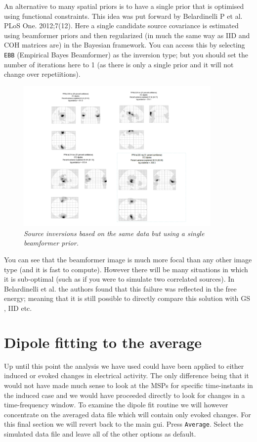 An alternative to many spatial priors is to have a single prior that is optimised using functional constraints. This idea was put forward by Belardinelli P et al. PLoS One. 2012;7(12). Here a single candidate source covariance is estimated using beamformer priors and then regularized (in much the same way as IID and COH matrices are) in the Bayesian framework. You can access this by selecting \texttt{EBB} (Empirical Bayes Beamformer) as the inversion type; but you should set the number of iterations here to 1 (as there is only a single prior and it will not change over repetiitions).

\begin{figure}
\begin{center}
\includegraphics[width=100mm]{meg_sloc/slide8}
\caption{\em  Source inversions based on the same data but using a single beamformer prior.\label{meg_sloc:fig:8}}
\end{center}
\end{figure}

You can see that the beamformer image is much more focal than any other image type (and it is fast to compute). However there will be many situations in which it is sub-optimal (such as if you were to simulate two correlated sources). In Belardinelli et al. the authors found that this failure was reflected in the free energy; meaning that it is still possible to directly compare this solution with GS , IID etc.



\section{Dipole fitting to the average}

 Up until this point the analysis we have used could have been applied to either induced or evoked changes in electrical activity. The only difference being that it would not have made much sense to look at the MSPs for specific time-instants in the induced case and we would have proceeded directly to look for changes in a time-frequency window. To examine the dipole fit routine we will however concentrate on the averaged data file which will contain only evoked changes. 
For this final section we will revert back to the main gui.
Press  \texttt{Average}. Select the simulated data file and leave all of the other options as default.

